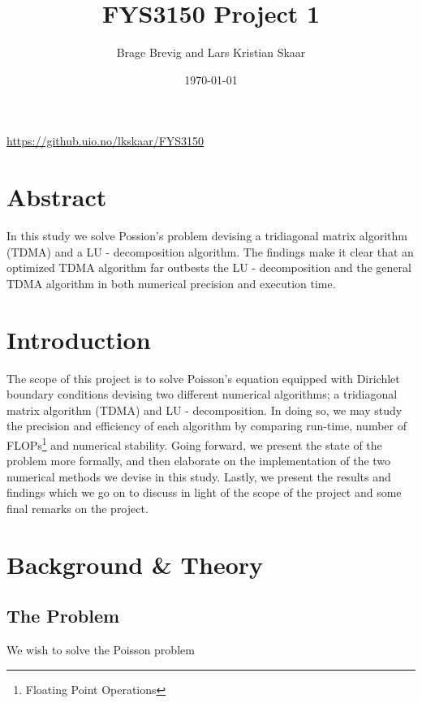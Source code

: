 \documentclass[a4paper, english]{amsart} %
\begin{document}
\hypersetup{linkcolor=black} %


\setlength\parindent{0pt}
\newpage

\title{FYS3150 Project 1}
\author{Brage Brevig and Lars Kristian Skaar}
\date{\today} %
\maketitle
\begin{center}
\url{https://github.uio.no/lkskaar/FYS3150}
\end{center}

\section{Abstract}
In this study we solve Possion's problem devising a tridiagonal matrix algorithm (TDMA) and a LU - decomposition algorithm. The findings make it clear that an optimized TDMA algorithm far outbests the LU - decomposition and the general TDMA algorithm in both numerical precision and execution time. 
\newpage

\section{Introduction}
The scope of this project is to solve Poisson's equation equipped with Dirichlet boundary conditions devising two different numerical algorithms; a tridiagonal matrix algorithm (TDMA) and LU - decomposition. In doing so, we may study the precision and efficiency of each algorithm by comparing run-time, number of FLOPs\footnote{Floating Point Operations} and numerical stability. Going forward, we present the state of the problem more formally, and then elaborate on the implementation of the two numerical methods we devise in this study. Lastly, we present the results and findings which we go on to discuss in light of the scope of the project and some final remarks on the project.

\section{Background \& Theory}
\subsection{The Problem}
We wish to solve the Poisson problem
\end{document}
